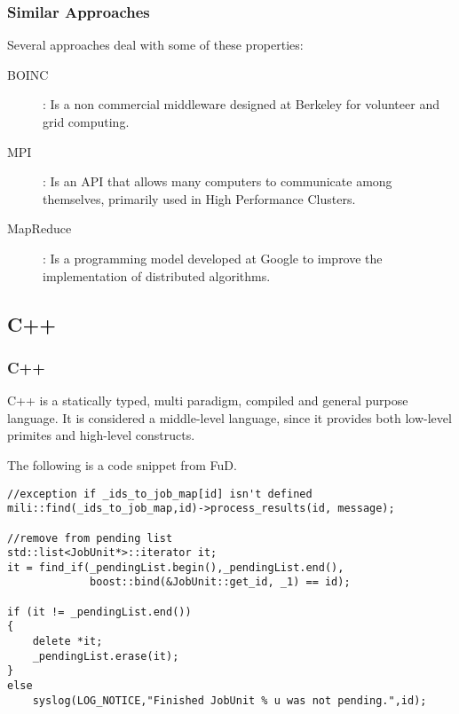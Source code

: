 \documentclass[xcolor=pdftex,dvipsnames,table,10pt,babel]{beamer}
\begin{document}
    \begin{frame}
     \frametitle{Similar Approaches}
     
     Several approaches deal with some of these properties:
     
     \begin{block}{}
     \begin{description}
     \item [BOINC]: Is a non commercial middleware designed at Berkeley for volunteer and grid computing\cite{boinc1}.
     \pause
     \item [MPI]: Is an API that allows many computers to communicate among themselves, primarily used in High Performance Clusters\cite{mpi}.
     \pause
     \item [MapReduce]: Is a programming model developed at Google to improve the implementation of distributed algorithms\cite{mapreduce}.
     \end{description}

     \end{block}

    \end{frame}

\subsection*{C++}

\begin{frame}[fragile]
  \frametitle{C++}

C++ is a statically typed, multi paradigm, compiled and general purpose language. It is considered a middle-level language, since it provides both low-level primites and high-level constructs.

The following is a code snippet from FuD.

\lstset{language=C++}
\begin{lstlisting}[frame=single]
//exception if _ids_to_job_map[id] isn't defined
mili::find(_ids_to_job_map,id)->process_results(id, message);

//remove from pending list
std::list<JobUnit*>::iterator it;
it = find_if(_pendingList.begin(),_pendingList.end(), 
             boost::bind(&JobUnit::get_id, _1) == id);

if (it != _pendingList.end())
{
    delete *it;
    _pendingList.erase(it);
}
else
    syslog(LOG_NOTICE,"Finished JobUnit % u was not pending.",id);
\end{lstlisting}


\end{frame}
\end{document}
